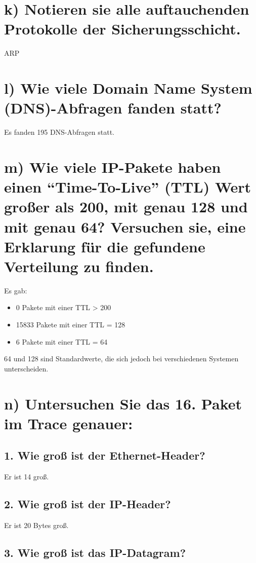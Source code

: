 \documentclass[a4paper, 11pt, fleqn, notitlepage, egregdoesnotlikesansseriftitles]{scrartcl}
\begin{document}
\section{k) Notieren sie alle auftauchenden Protokolle der Sicherungsschicht.}
ARP

\section{l) Wie viele Domain Name System (DNS)-Abfragen fanden statt?}
Es fanden 195 DNS-Abfragen statt.

\section{m) Wie viele IP-Pakete haben einen “Time-To-Live” (TTL) Wert großer als 200, mit genau 128 und mit genau 64? Versuchen sie, eine Erklarung für die gefundene Verteilung zu finden.}

Es gab:
\begin{itemize}
    \item 0 Pakete mit einer TTL > 200
    \item 15833 Pakete mit einer TTL = 128
    \item 6 Pakete mit einer TTL = 64
\end{itemize}

64 und 128 sind Standardwerte, die sich jedoch bei verschiedenen Systemen unterscheiden.

\pagebreak
\section{n) Untersuchen Sie das 16. Paket im Trace genauer:}

\subsection{1. Wie groß ist der Ethernet-Header?}

Er ist 14 groß.

\subsection{2. Wie groß ist der IP-Header?}

Er ist 20 Bytes groß.

\subsection{3. Wie groß ist das IP-Datagram?}
\end{document}
